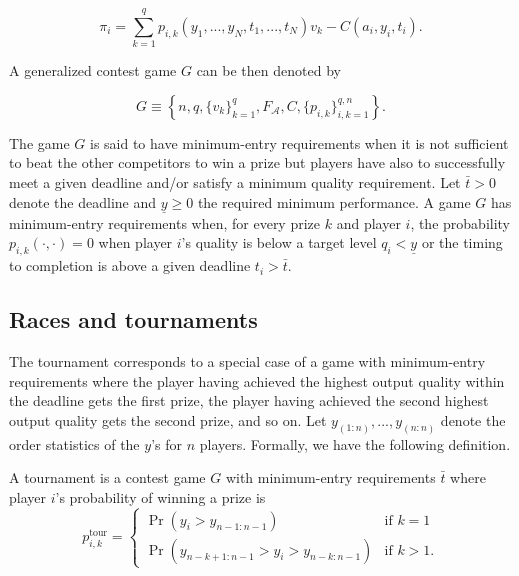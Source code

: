 \documentclass[12pt,]{article}
\newcommand\deadline{\bar{t}}
\newcommand\target{\underline{y}}
\newcommand\tournament{\text{tour}}
\begin{document}
\begin{equation}
  \label{expected payoff}
  \pi_i = \sum_{k=1}^{q} p_{i, k}(y_1,..., y_N, t_1, ..., t_N) v_k - C(a_i, y_i, t_i). 
\end{equation}

A generalized contest game \(G\) can be then denoted by

\begin{equation}
G \equiv \left\{
    n, q, \{v_k\}_{k=1}^{q},  F_\mathcal{A}, C, \{p_{i,k}\}_{i,k=1}^{q,n} 
  \right\}.
\end{equation}

The game \(G\) is said to have minimum-entry requirements when it is not
sufficient to beat the other competitors to win a prize but players have
also to successfully meet a given deadline and/or satisfy a minimum
quality requirement. Let \(\deadline>0\) denote the deadline and
\(\target\geq 0\) the required minimum performance. A game \(G\) has
minimum-entry requirements when, for every prize \(k\) and player \(i\),
the probability \(p_{i, k}(\cdot, \cdot)=0\) when player \(i\)'s quality
is below a target level \(q_i < \target\) or the timing to completion is
above a given deadline \(t_i>\deadline\).

\subsection{Races and tournaments}\label{races-and-tournaments}

The tournament corresponds to a special case of a game with
minimum-entry requirements where the player having achieved the highest
output quality within the deadline gets the first prize, the player
having achieved the second highest output quality gets the second prize,
and so on. Let \(y_{(1:n)}, ..., y_{(n:n)}\) denote the order statistics
of the \(y\)'s for \(n\) players. Formally, we have the following
definition.

\begin{definition}
A tournament is a contest game $G$ with minimum-entry requirements $\deadline$ where player $i$'s probability of winning a prize is
\begin{equation}
  p_{i, k}^\tournament =
  \begin{cases}
    \Pr(y_i > y_{n-1:n-1}) & \text{if }k=1\\
    \Pr(y_{n-k+1:n-1} > y_i > y_{n-k:n-1}) & \text{if }k>1.
  \end{cases}
\end{equation}
\end{definition}
\end{document}
